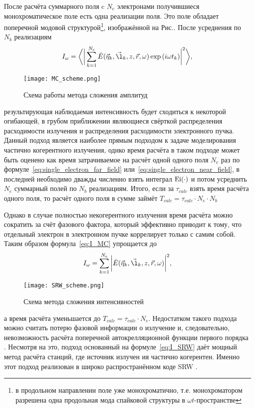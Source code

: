 После расчёта суммарного поля c $N_e$ электронами получившиеся монохроматическое поле есть одна реализации поля. Это поле обладает поперечной модовой структурой\footnote{в продольном направлении поле уже монохроматично, т.е. монохроматором разрешена одна продольная мода спайковой структуры в $\omega t$-пространстве}, изображённой на Рис.. После усреднения по $N_b$ реализациям  
\begin{align}
	I_{\omega} = \bigg \langle \bigg|\sum\limits_{k=1}^{N_e} \bar{E}(\vec{\eta}_k, \vec{\l}_k, z, \vec{r}, \omega) \exp{(i \omega t_k)}\bigg|^2 \bigg \rangle,
	\label{eq:I_MC} 
\end{align}
\begin{figure}[H] 
	\centering 	\texttt{[image: MC\_scheme.png]}
	\caption{Схема работы метода сложения амплитуд}
	\label{fig:SRW_scheme}
\end{figure}
результирующая наблюдаемая интенсивность будет сходиться к некоторой огибающей, в грубом приближении являющиеся свёрткой распределения расходимости излучения и распределения расходимости электронного пучка. Данный подход является наиболее прямым подходом к задаче моделирования частично когерентного излучения, однко время расчёта в таком подходе может быть оценено как время затрачиваемое на расчёт одной одного поля $N_e$ раз по формуле~\ref{eq:single_electron_far_field} или~\ref{eq:single_electron_near_field}, в последней необходимо дважды численно взять интеграл $\textup{Ei}(\cdot)$ и потом усреднить $N_e$ суммарный полей по $N_b$ реализациям. Итого, если за $\tau_{calc}$ взять время расчёта одного поля, то расчёт одного поля в сумме займёт $T_{calc} = \tau_{calc} \cdot N_e \cdot N_b$ 

Однако в случае полностью некогерентного излучения время расчёта можно сократить за счёт фазового фактора, который эффективно приводит к тому, что отдельный электрон в электронном пучке коррелирует только с самим собой. Таким образом формула~\ref{eq:I_MC} упрощается до 
\begin{align}
 	I_{\omega} = \sum\limits_{k=1}^{N_e} \bigg|\bar{E}(\vec{\eta}_k, \vec{\l}_k, z, \vec{r}, \omega)\bigg|^2,
 	\label{eq:I_SRW} 
\end{align}
\begin{figure}[H] 
	\centering 	\texttt{[image: SRW\_scheme.png]}
	\caption{Схема метода сложения интенсивностей}
	\label{fig:SRW_scheme}
\end{figure}
а время расчёта уменьшается до $T_{calc} = \tau_{calc} \cdot N_e$. Недостатком такого подхода можно считать потерю фазовой информации о излучение и, следовательно, невозможность расчёта поперечной автокрелляционной функции первого порядка . Несмотря на это, подход основанный на формуле~\ref{eq:I_SRW} даёт мощный метод расчёта станций, где источник излучен ия частично когерентен. Именно этот подход реализован в широко распространённом коде SRW .
 
